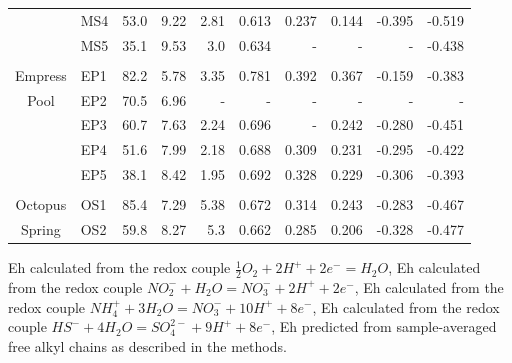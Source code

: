 \begin{landscape}
\begin{table}
\begin{adjustbox}{width=\textheight,keepaspectratio}
\begin{threeparttable}
\begin{tabular}{clrrrrrrrr}
      & MS4   & 53.0  & 9.22  & 2.81  & 0.613 & 0.237 & 0.144 & -0.395 & -0.519 \\
      & MS5   & 35.1  & 9.53  & 3.0   & 0.634 & -     & -     & -     & -0.438 \\
      &       &       &       &       &       &       &       &       &  \\
Empress & EP1   & 82.2  & 5.78  & 3.35  & 0.781 & 0.392 & 0.367 & -0.159 & -0.383 \\
Pool  & EP2   & 70.5  & 6.96  & -     & -     & -     & -     & -     & - \\
      & EP3   & 60.7  & 7.63  & 2.24  & 0.696 & -     & 0.242 & -0.280 & -0.451 \\
      & EP4   & 51.6  & 7.99  & 2.18  & 0.688 & 0.309 & 0.231 & -0.295 & -0.422 \\
      & EP5   & 38.1  & 8.42  & 1.95  & 0.692 & 0.328 & 0.229 & -0.306 & -0.393 \\
      &       &       &       &       &       &       &       &       &  \\
Octopus & OS1   & 85.4  & 7.29  & 5.38  & 0.672 & 0.314 & 0.243 & -0.283 & -0.467 \\
Spring & OS2   & 59.8  & 8.27  & 5.3   & 0.662 & 0.285 & 0.206 & -0.328 & -0.477 \\
\bottomrule
\end{tabular}%










  
  \begin{tablenotes}
     Eh calculated from the redox couple $\frac{1}{2}O_{2} + 2H^{+} + 2e^{-} = H_{2}O$,
     Eh calculated from the redox couple $NO_{2}^{-} + H_{2}O = NO_{3}^{-}+ 2H^{+} + 2e^{-}$,
     Eh calculated from the redox couple $NH_{4}^{+} + 3H_{2}O = NO_{3}^{-}+ 10H^{+} + 8e^{-}$,
     Eh calculated from the redox couple $HS^{-} + 4H_{2}O = SO_{4}^{2-}+ 9H^{+} + 8e^{-}$,
     Eh predicted from sample-averaged free alkyl chains as described in the methods.
    
        
  \end{tablenotes}
  
  \label{tab:eh_results}
  \end{threeparttable}
  \end{adjustbox}
\end{table}

\setcounter{tabcounter}{0} %
\doublespace
\end{landscape}


